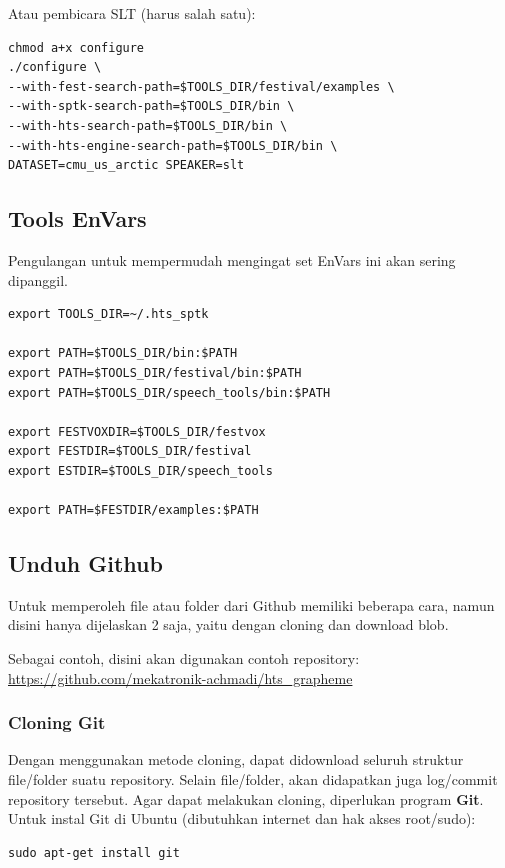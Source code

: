 \documentclass[12pt,]{article}
\begin{document}
\begin{enumerate}
		Atau pembicara SLT (harus salah satu):
		\begin{verbatim}
chmod a+x configure
./configure \
--with-fest-search-path=$TOOLS_DIR/festival/examples \
--with-sptk-search-path=$TOOLS_DIR/bin \
--with-hts-search-path=$TOOLS_DIR/bin \
--with-hts-engine-search-path=$TOOLS_DIR/bin \
DATASET=cmu_us_arctic SPEAKER=slt
		\end{verbatim}
		
	\end{enumerate}
	
	\newpage
	\subsection{Tools EnVars}
	
	Pengulangan untuk mempermudah mengingat set EnVars ini akan sering dipanggil.
	
	\begin{verbatim}
export TOOLS_DIR=~/.hts_sptk

export PATH=$TOOLS_DIR/bin:$PATH
export PATH=$TOOLS_DIR/festival/bin:$PATH
export PATH=$TOOLS_DIR/speech_tools/bin:$PATH

export FESTVOXDIR=$TOOLS_DIR/festvox
export FESTDIR=$TOOLS_DIR/festival
export ESTDIR=$TOOLS_DIR/speech_tools

export PATH=$FESTDIR/examples:$PATH
	\end{verbatim}
	
	\subsection{Unduh Github}
	
	Untuk memperoleh file atau folder dari Github memiliki beberapa cara,
	namun disini hanya dijelaskan 2 saja, 
	yaitu dengan cloning dan download blob.
	
	Sebagai contoh, disini akan digunakan contoh repository:\\
	\url{https://github.com/mekatronik-achmadi/hts_grapheme}
	
	\subsubsection{Cloning Git}
	
	Dengan menggunakan metode cloning, dapat didownload seluruh struktur file/folder suatu repository.
	Selain file/folder, akan didapatkan juga log/commit repository tersebut. 
	Agar dapat melakukan cloning, diperlukan program \textbf{Git}.
	Untuk instal Git di Ubuntu (dibutuhkan internet dan hak akses root/sudo):
	\begin{verbatim}
sudo apt-get install git
	\end{verbatim}
	
\end{document}
